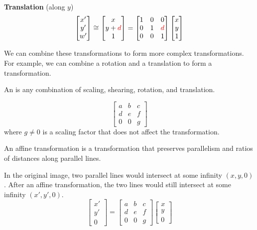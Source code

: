 \begin{itemize}
    \textbf{Translation} (along $y$) \[
        \begin{bmatrix}
            x' \\ y' \\ w'
        \end{bmatrix} \cong \begin{bmatrix}
            x \\ y + {\color{red} d} \\ 1
        \end{bmatrix} = \begin{bmatrix}
            1 & 0 & 0 \\
            0 & 1 & {\color{red} d} \\
            0 & 0 & 1
        \end{bmatrix} \begin{bmatrix}
            x \\ y \\ 1
        \end{bmatrix}
    \]
\end{itemize}

We can combine these transformations to form more complex transformations. For example, we can combine a rotation and a translation to form a  transformation. 

\begin{definition}
    An  is any combination of scaling, shearing, rotation, and translation.

    \[ 
        \begin{bmatrix}
            a & b & c \\
            d & e & f \\
            0 & 0 & g
        \end{bmatrix} 
    \] where $g \neq 0$ is a scaling factor that does not affect the transformation.
\end{definition}

\begin{remark}
    An affine transformation is a transformation that preserves parallelism and ratios of distances along parallel lines.
\end{remark}

In the original image, two parallel lines would intersect at some infinity $(x, y, 0)$. After an affine transformation, the two lines would still intersect at some infinity $(x', y', 0)$. \[
    \begin{bmatrix}
        x' \\ y' \\ 0
    \end{bmatrix} = \begin{bmatrix}
        a & b & c \\
        d & e & f \\
        0 & 0 & g
    \end{bmatrix} \begin{bmatrix}
        x \\ y \\ 0
    \end{bmatrix}
\]

